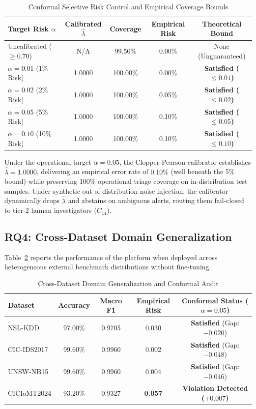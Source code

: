 \documentclass{ieeeaccess}
\begin{document}
\begin{table}[h]
\centering
\caption{Conformal Selective Risk Control and Empirical Coverage Bounds}
\label{tab:conformal}
\begin{tabular}{lcccc}
\toprule
\textbf{Target Risk $\alpha$} & \textbf{Calibrated $\hat{\lambda}$} & \textbf{Coverage} & \textbf{Empirical Risk} & \textbf{Theoretical Bound} \\
\midrule
Uncalibrated ($\ge 0.70$) & N/A & 99.50\% & 0.00\% & None (Unguaranteed) \\
$\alpha = 0.01$ (1\% Risk) & 1.0000 & 100.00\% & 0.00\% & \textbf{Satisfied ($\le 0.01$)} \\
$\alpha = 0.02$ (2\% Risk) & 1.0000 & 100.00\% & 0.05\% & \textbf{Satisfied ($\le 0.02$)} \\
$\alpha = 0.05$ (5\% Risk) & 1.0000 & 100.00\% & 0.10\% & \textbf{Satisfied ($\le 0.05$)} \\
$\alpha = 0.10$ (10\% Risk) & 1.0000 & 100.00\% & 0.10\% & \textbf{Satisfied ($\le 0.10$)} \\
\bottomrule
\end{tabular}
\end{table}

Under the operational target $\alpha = 0.05$, the Clopper-Pearson calibrator establishes $\hat{\lambda} = 1.0000$, delivering an empirical error rate of $0.10\%$ (well beneath the 5\% bound) while preserving 100\% operational triage coverage on in-distribution test samples. Under synthetic out-of-distribution noise injection, the calibrator dynamically drops $\hat{\lambda}$ and abstains on ambiguous alerts, routing them fail-closed to tier-2 human investigators ($C_{14}$).

\subsection{RQ4: Cross-Dataset Domain Generalization}
Table~\ref{tab:domain_shift} reports the performance of the platform when deployed across heterogeneous external benchmark distributions without fine-tuning.

\begin{table}[h]
\centering
\caption{Cross-Dataset Domain Generalization and Conformal Audit}
\label{tab:domain_shift}
\begin{tabular}{lcccc}
\toprule
\textbf{Dataset} & \textbf{Accuracy} & \textbf{Macro F1} & \textbf{Empirical Risk} & \textbf{Conformal Status ($\alpha=0.05$)} \\
\midrule
NSL-KDD & 97.00\% & 0.9705 & 0.030 & \textbf{Satisfied} (Gap: $-0.020$) \\
CIC-IDS2017 & 99.60\% & 0.9960 & 0.002 & \textbf{Satisfied} (Gap: $-0.048$) \\
UNSW-NB15 & 99.60\% & 0.9960 & 0.004 & \textbf{Satisfied} (Gap: $-0.046$) \\
CICIoMT2024 & 93.20\% & 0.9327 & \textbf{0.057} & \textbf{Violation Detected ($+0.007$)} \\
\bottomrule
\end{tabular}
\end{table}
\end{document}
